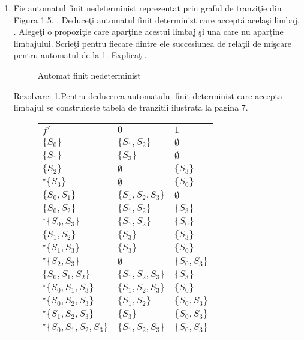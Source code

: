 \begin{enumerate}
\item
Fie automatul finit nedeterminist reprezentat prin graful de tranziţie din Figura 1.5.
. Deduceţi automatul finit determinist care acceptă acelaşi limbaj.
. Alegeţi o propoziţie care aparţine acestui limbaj şi una care nu aparţine limbajului. Scrieţi pentru fiecare dintre ele succesiunea de relaţii de mişcare pentru automatul de la 1. Explicaţi.

\begin{figure}[H]
\caption{Automat finit nedeterminist}
\end{figure}

\par Rezolvare:
\newline1.Pentru deducerea automatului finit determinist care accepta limbajul se construieste tabela de tranzitii ilustrata la pagina 7.

\begin{figure}[H]
\centering
\begin{tabular}{| l  | l | p{2cm} | }
    \hline
    $ f'$ &$0$ & $1$ \\ \hline
    $\{S_0\}$&$\{S_1,S_2\}$&$\emptyset$  \\ \hline
    $\{S_1\}$&$\{S_3\}$&$\emptyset$  \\ \hline
    $\{S_2\}$&$\emptyset$&$\{S_3\}$  \\ \hline
    $^\star\{S_3\}$&$\emptyset$&$\{S_0\}$  \\ \hline
    $\{S_0,S_1\}$&$\{S_1,S_2,S_3\}$&$\emptyset$  \\ \hline
    $\{S_0,S_2\}$&$\{S_1,S_2\}$&$\{S_3\}$  \\ \hline
    $^\star\{S_0,S_3\}$&$\{S_1,S_2\}$&$\{S_0\}$  \\ \hline
    $\{S_1,S_2\}$&$\{S_3\}$&$\{S_3\}$  \\ \hline
    $^\star\{S_1,S_3\}$&$\{S_3\}$&$\{S_0\}$  \\ \hline
    $^\star\{S_2,S_3\}$&$\emptyset$&$\{S_0,S_3\}$  \\ \hline
    $\{S_0,S_1,S_2\}$&$\{S_1,S_2,S_3\}$&$\{S_3\}$  \\ \hline
    $^\star\{S_0,S_1,S_3\}$&$\{S_1,S_2,S_3\}$&$\{S_0\}$  \\ \hline
    $^\star\{S_0,S_2,S_3\}$&$\{S_1,S_2\}$&$\{S_0,S_3\}$  \\ \hline
    $^\star\{S_1,S_2,S_3\}$&$\{S_3\}$&$\{S_0,S_3\}$  \\ \hline
    $^\star\{S_0,S_1,S_2,S_3\}$&$\{S_1,S_2,S_3\}$&$\{S_0,S_3\}$  \\ \hline
 \end{tabular}
\end{figure}


\end{enumerate}
